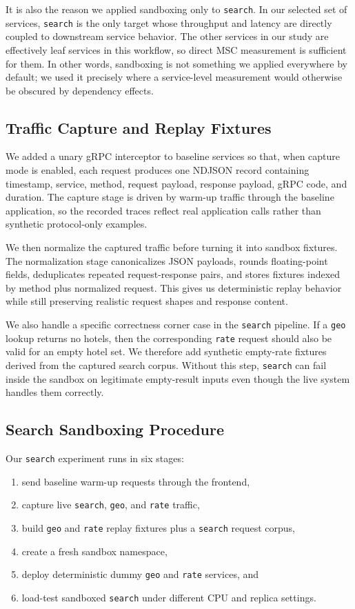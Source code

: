 \documentclass[conference]{IEEEtran}
\begin{document}
It is also the reason we applied sandboxing only to \texttt{search}. In our selected set of services, \texttt{search} is the only target whose throughput and latency are directly coupled to downstream service behavior. The other services in our study are effectively leaf services in this workflow, so direct MSC measurement is sufficient for them. In other words, sandboxing is not something we applied everywhere by default; we used it precisely where a service-level measurement would otherwise be obscured by dependency effects.

\subsection{Traffic Capture and Replay Fixtures}
We added a unary gRPC interceptor to baseline services so that, when capture mode is enabled, each request produces one NDJSON record containing timestamp, service, method, request payload, response payload, gRPC code, and duration. The capture stage is driven by warm-up traffic through the baseline application, so the recorded traces reflect real application calls rather than synthetic protocol-only examples.

We then normalize the captured traffic before turning it into sandbox fixtures. The normalization stage canonicalizes JSON payloads, rounds floating-point fields, deduplicates repeated request-response pairs, and stores fixtures indexed by method plus normalized request. This gives us deterministic replay behavior while still preserving realistic request shapes and response content.

We also handle a specific correctness corner case in the \texttt{search} pipeline. If a \texttt{geo} lookup returns no hotels, then the corresponding \texttt{rate} request should also be valid for an empty hotel set. We therefore add synthetic empty-rate fixtures derived from the captured search corpus. Without this step, \texttt{search} can fail inside the sandbox on legitimate empty-result inputs even though the live system handles them correctly.

\subsection{Search Sandboxing Procedure}
Our \texttt{search} experiment runs in six stages:
\begin{enumerate}
\item send baseline warm-up requests through the frontend,
\item capture live \texttt{search}, \texttt{geo}, and \texttt{rate} traffic,
\item build \texttt{geo} and \texttt{rate} replay fixtures plus a \texttt{search} request corpus,
\item create a fresh sandbox namespace,
\item deploy deterministic dummy \texttt{geo} and \texttt{rate} services, and
\item load-test sandboxed \texttt{search} under different CPU and replica settings.
\end{enumerate}
\end{document}

